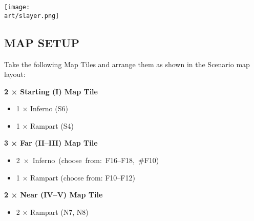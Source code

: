 \begin{multicols*}{2}
%
%
%
%
%

\begin{center}
  {\texttt{[image: \\art/slayer.png]}}
\end{center}

\subsection*{\MakeUppercase{Map Setup}}

Take the following Map Tiles and arrange them as shown in the Scenario map layout:

\textbf{2 × Starting (I) Map Tile}
\begin{itemize}
  \item 1 × Inferno (S6)
  \item 1 × Rampart (S4)
\end{itemize}

\textbf{3 × Far (II--III) Map Tile}
\begin{itemize}
  \item \mbox{2 × Inferno (choose from: F16--F18, \#F10)}
  \item 1 × Rampart (choose from: F10--F12)
\end{itemize}

\textbf{2 × Near (IV--V) Map Tile}
\begin{itemize}
  \item 2 × Rampart (N7, N8)
\end{itemize}


\end{multicols*}
